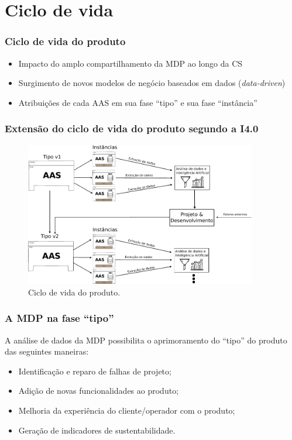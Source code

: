 \documentclass[10pt]{beamer}
\begin{document}
\section{Ciclo de vida}

\begin{frame}
	\frametitle{Ciclo de vida do produto}
	
	\begin{itemize}
		\item Impacto do amplo compartilhamento da MDP ao longo da CS
		\item Surgimento de novos modelos de negócio baseados em dados (\textit{data-driven})
		\item Atribuições de cada AAS em sua fase ``tipo'' e sua fase ``instância''
	\end{itemize}
	
\end{frame}
\begin{frame}
	\frametitle{Extensão do ciclo de vida do produto segundo a I4.0}
	
	\begin{figure}[htb!]
		\centering
		\caption{Ciclo de vida do produto.}
		\label{fig:aas-lifecycle}
		\includegraphics[width=0.9\textwidth]{aas-lifecycle}
	\end{figure}
	
\end{frame}
\begin{frame}
	\frametitle{A MDP na fase ``tipo''}
	
	A análise de dados da MDP possibilita o aprimoramento do ``tipo'' do produto das seguintes maneiras:
	
	\begin{itemize}
		\item Identificação e reparo de falhas de projeto;
		\item Adição de novas funcionalidades ao produto;
		\item Melhoria da experiência do cliente/operador com o produto;
		\item Geração de indicadores de sustentabilidade.
	\end{itemize}
	
\end{frame}
\end{document}
